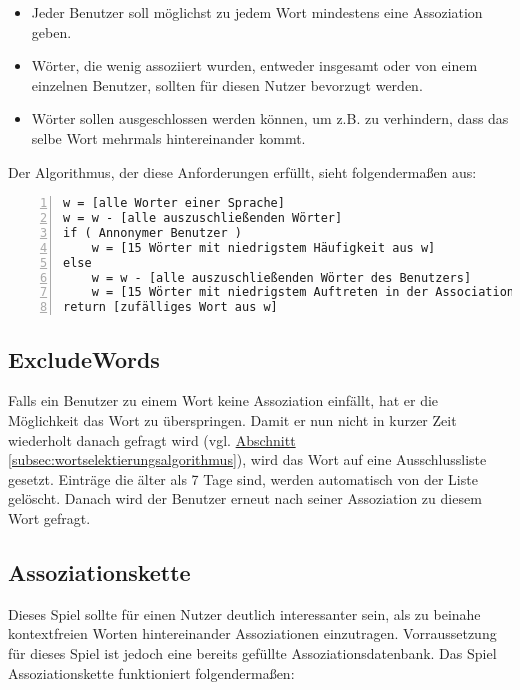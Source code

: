 \begin{itemize}
	\item Jeder Benutzer soll möglichst zu jedem Wort mindestens eine Assoziation geben.
	\item Wörter, die wenig assoziiert wurden, entweder insgesamt oder von einem einzelnen Benutzer, sollten für diesen Nutzer bevorzugt werden.
	\item Wörter sollen ausgeschlossen werden können, um z.B. zu verhindern, dass das selbe Wort mehrmals hintereinander kommt.
\end{itemize}

Der Algorithmus, der diese Anforderungen erfüllt, sieht folgendermaßen aus:

\begin{lstlisting}[basicstyle=\ttfamily,
backgroundcolor=\color{lightgray},
showspaces=false,
showstringspaces=false,
showtabs=false,
columns=fixed,
frame=lines,
numbers=left,
numbersep=5pt,
breaklines=true,
captionpos=t,
caption=Wortselektierungsalgorithmus]
w = [alle Worter einer Sprache]
w = w - [alle auszuschließenden Wörter]
if ( Annonymer Benutzer )
    w = [15 Wörter mit niedrigstem Häufigkeit aus w]
else
    w = w - [alle auszuschließenden Wörter des Benutzers]
    w = [15 Wörter mit niedrigstem Auftreten in der AssociationHistory des Buntzers1 aus w]
return [zufälliges Wort aus w]
\end{lstlisting}

\subsection{ExcludeWords}\label{subsec:excludewords}
Falls ein Benutzer zu einem Wort keine Assoziation einfällt, hat er die Möglichkeit das Wort zu überspringen. Damit er nun nicht in kurzer Zeit wiederholt danach gefragt wird (vgl. \hyperref[subsec:wortselektierungsalgorithmus]{Abschnitt \ref*{subsec:wortselektierungsalgorithmus}}), wird das Wort auf eine Ausschlussliste gesetzt. Einträge die älter als 7 Tage sind, werden automatisch von der Liste gelöscht. Danach wird der Benutzer erneut nach seiner Assoziation zu diesem Wort gefragt.


\subsection{Assoziationskette}
Dieses Spiel sollte für einen Nutzer deutlich interessanter sein, als zu beinahe kontextfreien Worten hintereinander Assoziationen einzutragen. Vorraussetzung für dieses Spiel ist jedoch eine bereits gefüllte Assoziationsdatenbank. Das Spiel Assoziationskette funktioniert folgendermaßen:

